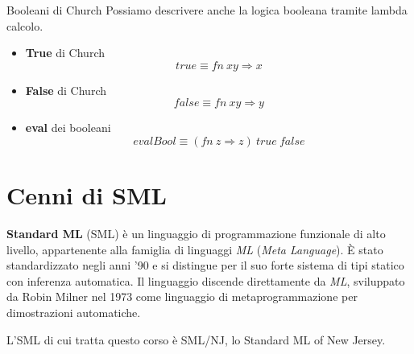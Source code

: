 \documentclass[a4paper,11pt]{report}
\begin{document}
\begin{defframe}{Booleani di Church}{}
    Possiamo descrivere anche la logica booleana tramite lambda calcolo.

    \begin{itemize}
    \item \textbf{True} di Church
            \[ true \equiv fn \ x y \Rightarrow x \]
    \item \textbf{False} di Church
            \[ false \equiv fn \ x y \Rightarrow y \]
    \item \textbf{eval} dei booleani
            \[ evalBool \equiv (fn \ z \Rightarrow z)\ true \ false \]

    \end{itemize}
    
\end{defframe}

\section{Cenni di SML}
\textbf{Standard ML} (SML) è un linguaggio di programmazione funzionale di alto livello, appartenente alla famiglia di linguaggi \textit{ML} (\textit{Meta Language}). È stato standardizzato negli anni ’90 e si distingue per il suo forte sistema di tipi statico con inferenza automatica.
Il linguaggio discende direttamente da \textit{ML}, sviluppato da Robin Milner nel 1973 come linguaggio di metaprogrammazione per dimostrazioni automatiche.

L'SML di cui tratta questo corso è SML/NJ, lo Standard ML of New Jersey.
\end{document}

